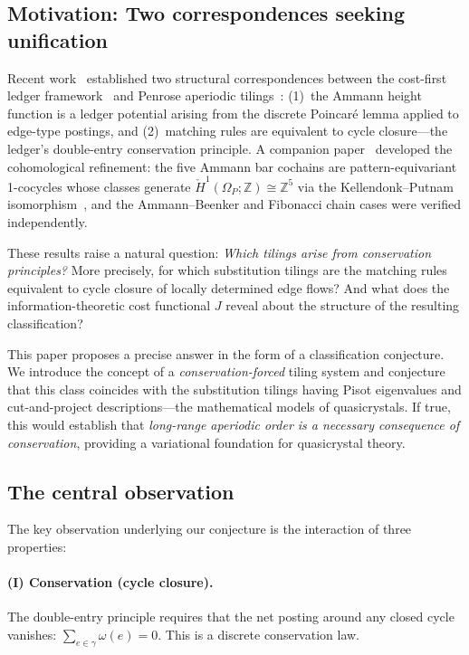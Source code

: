 \documentclass[12pt]{article}
\theoremstyle{definition}
\theoremstyle{remark}
\newcommand{\ZZ}{\mathbb{Z}}
\newcommand{\Hcech}{\check{H}}
\begin{document}
\subsection{Motivation: Two correspondences seeking unification}

Recent work~\cite{PardoGuerraGolden2026} established two structural correspondences between the cost-first ledger framework~\cite{PardoGuerraEtAl2026,WashburnZlatanovic2026} and Penrose aperiodic tilings~\cite{Penrose1974,BaakeGrimm2013}: (1)~the Ammann height function is a ledger potential arising from the discrete Poincar\'{e} lemma applied to edge-type postings, and (2)~matching rules are equivalent to cycle closure---the ledger's double-entry conservation principle. A companion paper~\cite{PardoGuerraCohom2026} developed the cohomological refinement: the five Ammann bar cochains are pattern-equivariant 1-cocycles whose classes generate $\Hcech^1(\Omega_P; \ZZ) \cong \ZZ^5$ via the Kellendonk--Putnam isomorphism~\cite{KellendonkPutnam2006}, and the Ammann--Beenker and Fibonacci chain cases were verified independently.

These results raise a natural question: \emph{Which tilings arise from conservation principles?} More precisely, for which substitution tilings are the matching rules equivalent to cycle closure of locally determined edge flows? And what does the information-theoretic cost functional $J$ reveal about the structure of the resulting classification?

This paper proposes a precise answer in the form of a classification conjecture. We introduce the concept of a \emph{conservation-forced} tiling system and conjecture that this class coincides with the substitution tilings having Pisot eigenvalues and cut-and-project descriptions---the mathematical models of quasicrystals. If true, this would establish that \emph{long-range aperiodic order is a necessary consequence of conservation}, providing a variational foundation for quasicrystal theory.

\subsection{The central observation}

The key observation underlying our conjecture is the interaction of three properties:

\paragraph{(I) Conservation (cycle closure).} The double-entry principle requires that the net posting around any closed cycle vanishes: $\sum_{e \in \gamma} \omega(e) = 0$. This is a discrete conservation law.
\end{document}
